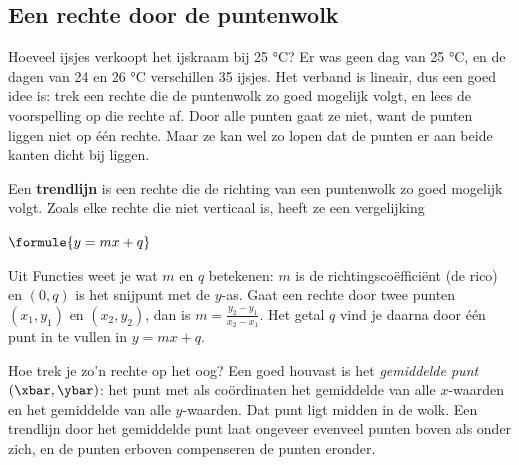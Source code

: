 \subsection{Een rechte door de puntenwolk}

Hoeveel ijsjes verkoopt het ijskraam bij 25 °C? Er was geen dag van 25 °C, en de dagen van 24 en 26 °C verschillen 35 ijsjes. Het verband is lineair, dus een goed idee is: trek een rechte die de puntenwolk zo goed mogelijk volgt, en lees de voorspelling op die rechte af. Door alle punten gaat ze niet, want de punten liggen niet op één rechte. Maar ze kan wel zo lopen dat de punten er aan beide kanten dicht bij liggen.

\begin{theorie}
Een \textbf{\textcolor{accent}{trendlijn}} is een rechte die de richting van een puntenwolk zo goed mogelijk volgt. Zoals elke rechte die niet verticaal is, heeft ze een vergelijking

\vspace{1mm}
\qquad $\formule{y = mx + q}$
\end{theorie}

Uit Functies weet je wat $m$ en $q$ betekenen: $m$ is de richtingscoëfficiënt (de rico) en $(0, q)$ is het snijpunt met de $y$-as. Gaat een rechte door twee punten $(x_1, y_1)$ en $(x_2, y_2)$, dan is $m = \tfrac{y_2 - y_1}{x_2 - x_1}$. Het getal $q$ vind je daarna door één punt in te vullen in $y = mx + q$.

Hoe trek je zo'n rechte op het oog? Een goed houvast is het \textit{gemiddelde punt} $(\xbar, \ybar)$: het punt met als coördinaten het gemiddelde van alle $x$-waarden en het gemiddelde van alle $y$-waarden. Dat punt ligt midden in de wolk. Een trendlijn door het gemiddelde punt laat ongeveer evenveel punten boven als onder zich, en de punten erboven compenseren de punten eronder.

